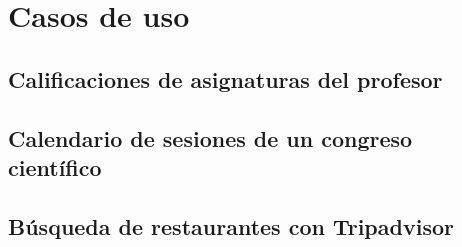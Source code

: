 \chapter{Casos de uso}

\section{Calificaciones de asignaturas del profesor}

\section{Calendario de sesiones de un congreso científico}

\section{Búsqueda de restaurantes con Tripadvisor}
